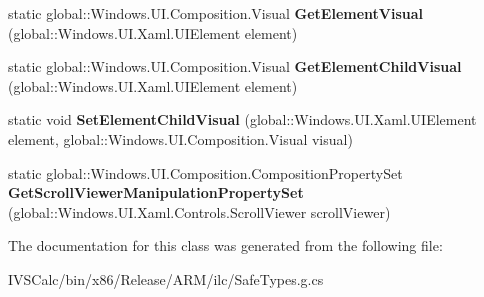\begin{DoxyCompactItemize}
static global\+::\+Windows.\+U\+I.\+Composition.\+Visual {\bfseries Get\+Element\+Visual} (global\+::\+Windows.\+U\+I.\+Xaml.\+U\+I\+Element element)
\item 
\mbox{\label{class_windows_1_1_u_i_1_1_xaml_1_1_hosting_1_1_element_composition_preview_a8187f1a70143d04232934a796b4099ef}} 
static global\+::\+Windows.\+U\+I.\+Composition.\+Visual {\bfseries Get\+Element\+Child\+Visual} (global\+::\+Windows.\+U\+I.\+Xaml.\+U\+I\+Element element)
\item 
\mbox{\label{class_windows_1_1_u_i_1_1_xaml_1_1_hosting_1_1_element_composition_preview_a214faabff7d601f8d727a4b0f000f677}} 
static void {\bfseries Set\+Element\+Child\+Visual} (global\+::\+Windows.\+U\+I.\+Xaml.\+U\+I\+Element element, global\+::\+Windows.\+U\+I.\+Composition.\+Visual visual)
\item 
\mbox{\label{class_windows_1_1_u_i_1_1_xaml_1_1_hosting_1_1_element_composition_preview_a97dcf75bcb6cd9ebb00b1029e9dc2b7d}} 
static global\+::\+Windows.\+U\+I.\+Composition.\+Composition\+Property\+Set {\bfseries Get\+Scroll\+Viewer\+Manipulation\+Property\+Set} (global\+::\+Windows.\+U\+I.\+Xaml.\+Controls.\+Scroll\+Viewer scroll\+Viewer)
\end{DoxyCompactItemize}


The documentation for this class was generated from the following file\+:\begin{DoxyCompactItemize}
\item 
I\+V\+S\+Calc/bin/x86/\+Release/\+A\+R\+M/ilc/Safe\+Types.\+g.\+cs\end{DoxyCompactItemize}
